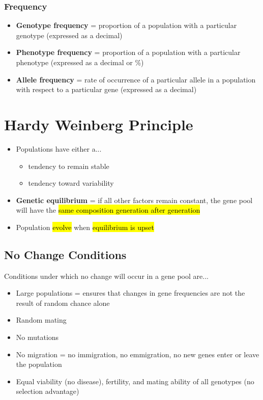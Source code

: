 \documentclass[a4paper,12pt]{article}
\begin{document}
\subsubsection{Frequency}
\begin{itemize}
    \item{\textbf{Genotype frequency} = proportion of a population with a particular genotype (expressed as a decimal)}
    \item{\textbf{Phenotype frequency} = proportion of a population with a particular phenotype (expressed as a decimal or \%)}
    \item{\textbf{Allele frequency} = rate of occurrence of a particular allele in a population with respect to a particular gene (expressed as a decimal)}
\end{itemize}

\section{Hardy Weinberg Principle}
\begin{itemize}
    \item{
            Populations have either a...
            \begin{itemize}
                \item{tendency to remain stable}
                \item{tendency toward variability}
            \end{itemize}
        }
    \item{\textbf{Genetic equilibrium} = if all other factors remain constant, the gene pool will have the \hl{same composition generation after generation}}
    \item{Population \hl{evolve} when \hl{equilibrium is upset}}
\end{itemize}

\subsection{No Change Conditions}
Conditions under which no change will occur in a gene pool are...
\begin{itemize}
    \item{Large populations = ensures that changes in gene frequencies are not the result of random chance alone}
    \item{Random mating}
    \item{No mutations}
    \item{No migration = no immigration, no emmigration, no new genes enter or leave the population}
    \item{Equal viability (no disease), fertility, and mating ability of all genotypes (no selection advantage)}
\end{itemize}
\end{document}
